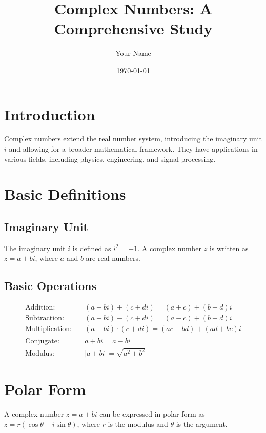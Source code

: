 \documentclass{article}
\title{Complex Numbers: A Comprehensive Study}
\author{Your Name}
\date{\today}
\begin{document}
\maketitle

\section{Introduction}

Complex numbers extend the real number system, introducing the imaginary unit $i$ and allowing for a broader mathematical framework. They have applications in various fields, including physics, engineering, and signal processing.

\section{Basic Definitions}

\subsection{Imaginary Unit}

The imaginary unit $i$ is defined as $i^2 = -1$. A complex number $z$ is written as $z = a + bi$, where $a$ and $b$ are real numbers.

\subsection{Basic Operations}

\begin{align}
    \text{Addition:} \quad &(a + bi) + (c + di) = (a + c) + (b + d)i \\
    \text{Subtraction:} \quad &(a + bi) - (c + di) = (a - c) + (b - d)i \\
    \text{Multiplication:} \quad &(a + bi) \cdot (c + di) = (ac - bd) + (ad + bc)i \\
    \text{Conjugate:} \quad &\overline{a + bi} = a - bi \\
    \text{Modulus:} \quad &|a + bi| = \sqrt{a^2 + b^2}
\end{align}

\section{Polar Form}

A complex number $z = a + bi$ can be expressed in polar form as $z = r(\cos \theta + i \sin \theta)$, where $r$ is the modulus and $\theta$ is the argument.
\end{document}
